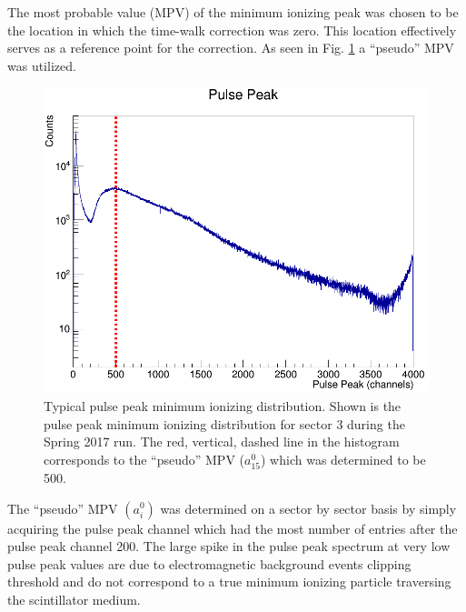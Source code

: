{The most probable value (MPV) of the minimum ionizing peak was chosen to be the location in which the time-walk correction was zero.  This location effectively serves as a reference point for the correction.  
As seen in Fig. \ref{fig:pulsepeakch15} a ``pseudo'' MPV was utilized.
	\begin{figure}[!htb]
		\centering
		\includegraphics[width=1.0\columnwidth]{calibration/figs/pulse_peak_ch15}
		\caption{Typical pulse peak minimum ionizing distribution.  Shown is the pulse peak minimum ionizing distribution for sector 3 during the Spring 2017 run. The red, vertical, dashed line in the histogram corresponds to the ``pseudo'' MPV ($a^{0}_{15}$) which was determined to be 500.}
		\label{fig:pulsepeakch15}
	\end{figure}
The ``pseudo'' MPV $(a^{0}_{i})$ was determined on a sector by sector basis by simply acquiring the pulse peak channel which had the most number of entries after the pulse peak channel 200.  The large spike in the pulse peak spectrum at very low pulse peak values are due to electromagnetic background events clipping threshold and do not correspond to a true minimum ionizing particle traversing the scintillator medium.

}
